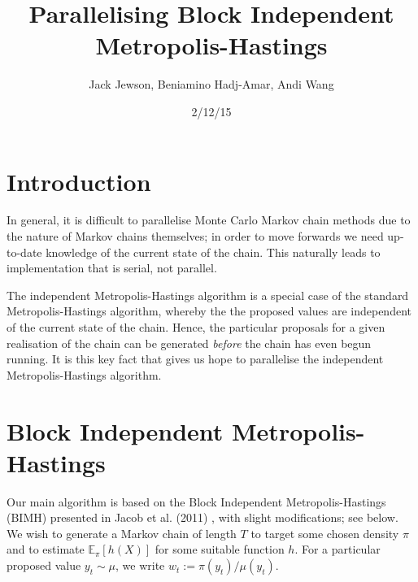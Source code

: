 \documentclass[11pt,a4paper]{article}
\title{Parallelising Block Independent Metropolis-Hastings}
\date{2/12/15}
\author{Jack Jewson, Beniamino Hadj-Amar, Andi Wang}
\begin{document}
\pagestyle{fancy}


\maketitle


\section{Introduction}


In general, it is difficult to parallelise Monte Carlo Markov chain methods due to the nature of Markov chains themselves; in order to move forwards we need up-to-date knowledge of the current state of the chain. This naturally leads to implementation that is serial, not parallel.

The independent Metropolis-Hastings algorithm is a special case of the standard Metropolis-Hastings algorithm, whereby the the proposed values are independent of the current state of the chain. Hence, the particular proposals for a given realisation of the chain can be generated \textit{before} the chain has even begun running. It is this key fact that gives us hope to parallelise the independent Metropolis-Hastings algorithm.


\section{Block Independent Metropolis-Hastings}

Our main algorithm is based on the Block Independent Metropolis-Hastings (BIMH) presented in Jacob et al. (2011) \cite{Jacob}, with slight modifications; see below. We wish to generate a Markov chain of length $T$ to target some chosen density $\pi$ and to estimate $\mathbb{E}_\pi[h(X)]$ for some suitable function $h$. For a particular proposed value $y_t\sim\mu$, we write $w_t:=\pi(y_t)/\mu(y_t)$.
\end{document}
